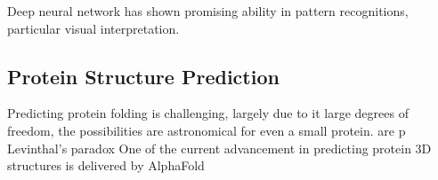 Deep neural network has shown promising ability in pattern recognitions, particular visual interpretation.
\par 

\subsection{Protein Structure Prediction}
Predicting protein folding is challenging, largely due to it large degrees of freedom, the possibilities are astronomical for even a small protein.  are p Levinthal's paradox One of the current advancement in predicting protein 3D structures is delivered by AlphaFold